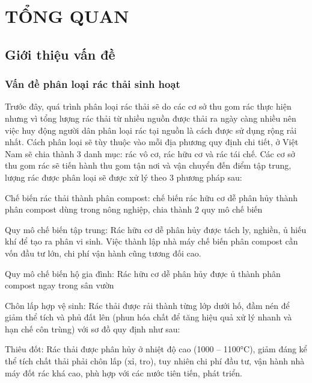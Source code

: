 
\chapter{TỔNG QUAN}
\section{Giới thiệu vấn đề}
\subsection{Vấn đề phân loại rác thải sinh hoạt}

Trước đây, quá trình phân loại rác thải sẽ do các cơ sở thu gom rác thực hiện nhưng vì tổng lượng rác thải từ nhiều nguồn được thải ra ngày càng nhiều nên việc huy động người dân phân loại rác tại nguồn là cách được sử dụng rộng rải nhất. Cách phân loại sẽ tùy thuộc vào mỗi địa phương quy định chi tiết, ở Việt Nam sẽ chia thành 3 danh mục: rác vô cơ, rác hữu cơ và rác tái chế. Các cơ sở thu gom rác sẽ tiến hành thu gom tận nơi và vận chuyển đến điểm tập trung, lượng rác được phân loại sẽ được xử lý theo 3 phương pháp sau:
 
Chế biến rác thải thành phân compost: chế biến rác hữu cơ dễ phân hủy thành phân compost dùng trong nông nghiệp, chia thành 2 quy mô chế biến

Quy mô chế biến tập trung: Rác hữu cơ dễ phân hủy được tách ly, nghiền, ủ hiếu khí để tạo ra phân vi sinh. Việc thành lập nhà máy chế biến phân compost cần vốn đầu tư lớn, chi phí vận hành cũng tương đối cao.

Quy mô chế biến hộ gia đình: Rác hữu cơ dễ phân hủy được ủ thành phân compost ngay trong sân vườn

Chôn lấp hợp vệ sinh: Rác thải được rải thành từng lớp dưới hố, đầm nén để giảm thể tích và phủ đất lên (phun  hóa chất để tăng hiệu quả xử lý nhanh và hạn chế côn trùng) với sơ đồ quy định như sau:


Thiêu đốt: Rác thải được phân hủy ở nhiệt độ cao (1000 – 1100°C), giảm đáng kể thể tích chất thải phải chôn lấp (xỉ, tro), tuy nhiên chi phí đầu tư, vận hành nhà máy đốt rác khá cao, phù hợp với các nước tiên tiến, phát triển. 

